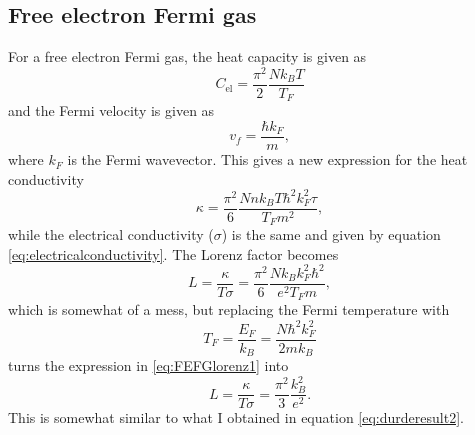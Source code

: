 \documentclass[11pt]{amsart}
\begin{document}
\subsection{Free electron Fermi gas}
For a free electron Fermi gas, the heat capacity is given as
\begin{equation}
C_{\text{el}} = \frac{\pi^2}{2} \frac{N k_BT}{T_F}
\end{equation}
and the Fermi velocity is given as
\begin{equation}
v_f = \frac{\hbar k_F}{m},
\end{equation}
where $k_F$ is the Fermi wavevector. This gives a new expression for the heat conductivity
\begin{equation}
\kappa = \frac{\pi^2}{6}\frac{Nnk_BT\hbar^2k_F^2\tau}{T_F m^2},
\end{equation}
while the electrical conductivity ($\sigma$) is the same and given by equation \ref{eq:electricalconductivity}. The Lorenz factor becomes
\begin{equation}
\label{eq:FEFGlorenz1}
L = \frac{\kappa}{T	\sigma} = \frac{\pi^2}{6}\frac{Nk_Bk_F^2\hbar^2}{e^2T_F m},
\end{equation}
which is somewhat of a mess, but replacing the Fermi temperature with
\begin{equation*}
T_F = \frac{E_F}{k_B} = \frac{N\hbar^2k_F^2}{2mk_B}
\end{equation*}
turns the expression in \ref{eq:FEFGlorenz1} into
\begin{equation}
L = \frac{\kappa}{T\sigma} = \frac{\pi^2}{3}\frac{k_B^2}{e^2}.
\end{equation}
This is somewhat similar to what I obtained in equation \ref{eq:durderesult2}.
\end{document}
